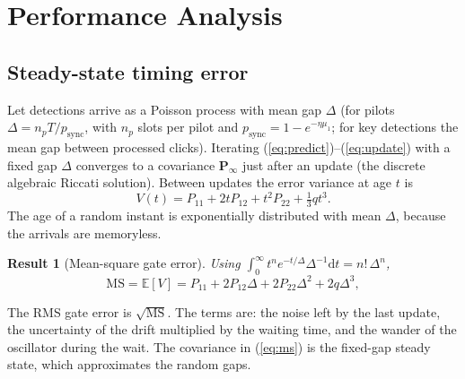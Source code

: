 \documentclass[journal]{IEEEtran}
\theoremstyle{plain}
\newtheorem{result}{Result}
\newcommand{\E}{\mathbb{E}}
\begin{document}
\section{Performance Analysis}
\label{sec:analysis}
\subsection{Steady-state timing error}
Let detections arrive as a Poisson process with mean gap $\Delta$ (for pilots $\Delta=n_pT/p_{\mathrm{sync}}$, with $n_p$ slots per pilot and $p_{\mathrm{sync}}=1-e^{-\eta\mu_1}$; for key detections the mean gap between processed clicks). Iterating (\ref{eq:predict})--(\ref{eq:update}) with a fixed gap $\Delta$ converges to a covariance $\mathbf P_\infty$ just after an update (the discrete algebraic Riccati solution). Between updates the error variance at age $t$ is
\begin{equation}
V(t)=P_{11}+2tP_{12}+t^2P_{22}+\tfrac13 q t^3.
\end{equation}
The age of a random instant is exponentially distributed with mean $\Delta$, because the arrivals are memoryless.

\begin{result}[Mean-square gate error]
\label{res:ms}
Using $\int_0^\infty t^n e^{-t/\Delta}\Delta^{-1}\mathrm{d}t=n!\,\Delta^n$,
\begin{equation}
\mathrm{MS}=\E[V]=P_{11}+2P_{12}\Delta+2P_{22}\Delta^2+2q\Delta^3,
\label{eq:ms}
\end{equation}
\end{result}
The RMS gate error is $\sqrt{\mathrm{MS}}$. The terms are: the noise left by the last update, the uncertainty of the drift multiplied by the waiting time, and the wander of the oscillator during the wait. The covariance in (\ref{eq:ms}) is the fixed-gap steady state, which approximates the random gaps.
\end{document}

